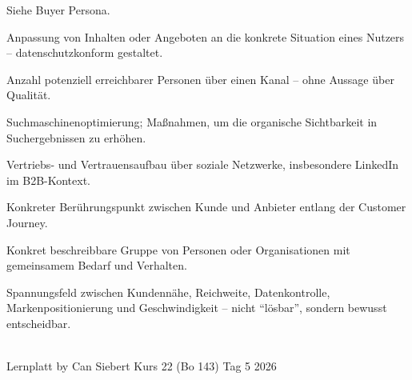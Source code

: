 \documentclass[11pt,a4paper,oneside]{article}
\begin{document}
\begin{description}[style=nextline,leftmargin=0pt,labelindent=0pt,itemsep=4pt]
  \item[Persona] Siehe Buyer Persona.
  \item[Personalisierung] Anpassung von Inhalten oder Angeboten an die konkrete Situation eines Nutzers -- datenschutzkonform gestaltet.
  \item[Reichweite] Anzahl potenziell erreichbarer Personen über einen Kanal -- ohne Aussage über Qualität.
  \item[SEO] Suchmaschinenoptimierung; Maßnahmen, um die organische Sichtbarkeit in Suchergebnissen zu erhöhen.
  \item[Social Selling] Vertriebs- und Vertrauensaufbau über soziale Netzwerke, insbesondere LinkedIn im B2B-Kontext.
  \item[Touchpoint] Konkreter Berührungspunkt zwischen Kunde und Anbieter entlang der Customer Journey.
  \item[Zielgruppe] Konkret beschreibbare Gruppe von Personen oder Organisationen mit gemeinsamem Bedarf und Verhalten.
  \item[Zielkonflikt (Kanalwahl)] Spannungsfeld zwischen Kundennähe, Reichweite, Datenkontrolle, Markenpositionierung und Geschwindigkeit -- nicht ``lösbar'', sondern bewusst entscheidbar.
\end{description}

\vspace{1cm}
\noindent{\color{lpAccent}\rule{\linewidth}{0.6pt}}\\[4pt]
{\footnotesize\sffamily\color{lpGray}Lernplatt \textperiodcentered{} by Can Siebert \textperiodcentered{} Kurs 22 (Bo 143) \textperiodcentered{} Tag 5 \textperiodcentered{} \textcopyright{} 2026}
\end{document}
